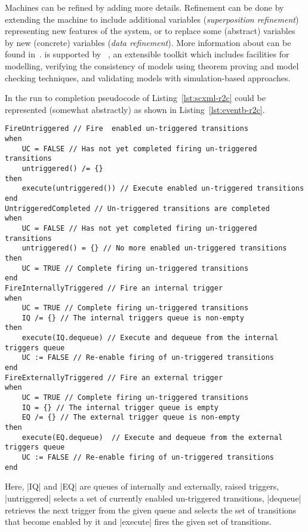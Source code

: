 Machines can be refined by adding more details.  Refinement can be done by extending the machine to include additional variables (\emph{superposition refinement}) representing new features of the system, or to replace some (abstract) variables by new (concrete) variables (\emph{data refinement}).  More information about \EventB can be found in~\cite{hoang13:_introd_event_b_model_method}.  \EventB is supported by \Rodin~\cite{abrial10:_rodin}, an extensible toolkit which includes facilities for modelling, verifying the consistency of models using theorem proving and model checking techniques, and validating models with simulation-based approaches.

In \EventB the run to completion pseudocode of Listing~\ref{lst:scxml-r2c} could be represented (somewhat abstractly) as shown in Listing~\ref{lst:eventb-r2c}.
\begin{lstlisting}[caption={Run to completion pseudocode in \EventB},label={lst:eventb-r2c}, language=Event-B, escapechar=|, frame=single, float=t]
 FireUntriggered // Fire  enabled un-triggered transitions
when
    UC = FALSE // Has not yet completed firing un-triggered transitions
    untriggered() /= {}
then
    execute(untriggered()) // Execute enabled un-triggered transitions
end
UntriggeredCompleted // Un-triggered transitions are completed
when
    UC = FALSE // Has not yet completed firing un-triggered transitions
    untriggered() = {} // No more enabled un-triggered transitions
then
    UC = TRUE // Complete firing un-triggered transitions
end
FireInternallyTriggered // Fire an internal trigger
when
    UC = TRUE // Complete firing un-triggered transitions
    IQ /= {} // The internal triggers queue is non-empty
then
    execute(IQ.dequeue) // Execute and dequeue from the internal triggers queue
    UC := FALSE // Re-enable firing of un-triggered transitions
end
FireExternallyTriggered // Fire an external trigger
when
    UC = TRUE // Complete firing un-triggered transitions
    IQ = {} // The internal trigger queue is empty
    EQ /= {} // The external trigger queue is non-empty
then
    execute(EQ.dequeue)  // Execute and dequeue from the external triggers queue
    UC := FALSE // Re-enable firing of un-triggered transitions
end
\end{lstlisting}	
Here, |IQ| and |EQ| are queues of internally and externally, raised triggers, |untriggered| selects a set of currently enabled un-triggered transitions, |dequeue| retrieves the next trigger from the given queue and selects the set of transitions that become enabled by it and |execute| fires the given set of transitions. 

